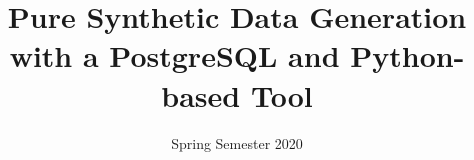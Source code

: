 \title  {Pure Synthetic Data Generation with a PostgreSQL and Python-based Tool}
\addresses  {\groupname\\\deptname\\\univname} 
\date       {Spring Semester 2020}


\maketitle